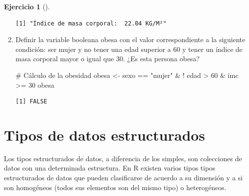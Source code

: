 \documentclass[
  a4paper,
]{scrreport}
\newenvironment{Shaded}{\begin{snugshade}}{\end{snugshade}}
\newcommand{\CommentTok}[1]{\textcolor[rgb]{0.37,0.37,0.37}{#1}}
\newcommand{\DecValTok}[1]{\textcolor[rgb]{0.68,0.00,0.00}{#1}}
\newcommand{\NormalTok}[1]{\textcolor[rgb]{0.00,0.23,0.31}{#1}}
\newcommand{\OtherTok}[1]{\textcolor[rgb]{0.00,0.23,0.31}{#1}}
\newcommand{\SpecialCharTok}[1]{\textcolor[rgb]{0.37,0.37,0.37}{#1}}
\newcommand{\StringTok}[1]{\textcolor[rgb]{0.13,0.47,0.30}{#1}}
\theoremstyle{definition}
\newtheorem{exercise}{Ejercicio}[chapter]
\theoremstyle{definition}
\theoremstyle{remark}
\begin{document}
\begin{exercise}[]
\begin{enumerate}
\begin{tcolorbox}
\begin{verbatim}
[1] "Índice de masa corporal:  22.04 KG/M²"
\end{verbatim}

  \end{tcolorbox}
\item
  Definir la variable booleana obesa con el valor correspondiente a la
  siguiente condición: ser mujer y no tener una edad superior a 60 y
  tener un índice de masa corporal mayor o igual que 30. ¿Es esta
  persona obesa?

  \begin{tcolorbox}[enhanced jigsaw, colbacktitle=quarto-callout-note-color!10!white, breakable, opacitybacktitle=0.6, left=2mm, opacityback=0, leftrule=.75mm, colframe=quarto-callout-note-color-frame, bottomrule=.15mm, toprule=.15mm, toptitle=1mm, colback=white, titlerule=0mm, title=\textcolor{quarto-callout-note-color}{\faInfo}\hspace{0.5em}{Solución}, rightrule=.15mm, arc=.35mm, bottomtitle=1mm, coltitle=black]

\begin{Shaded}
\begin{Highlighting}[]
\CommentTok{\# Cálculo de la obesidad}
\NormalTok{obesa }\OtherTok{\textless{}{-}}\NormalTok{ sexo }\SpecialCharTok{==} \StringTok{"mujer"} \SpecialCharTok{\&} \SpecialCharTok{!}\NormalTok{ edad }\SpecialCharTok{\textgreater{}} \DecValTok{60} \SpecialCharTok{\&}\NormalTok{ imc }\SpecialCharTok{\textgreater{}=} \DecValTok{30}
\NormalTok{obesa}
\end{Highlighting}
\end{Shaded}

\begin{verbatim}
[1] FALSE
\end{verbatim}

  \end{tcolorbox}
\end{enumerate}

\end{exercise}


\hypertarget{tipos-de-datos-estructurados}{%
\chapter{Tipos de datos
estructurados}\label{tipos-de-datos-estructurados}}

Los tipos estructurados de datos, a diferencia de los simples, son
colecciones de datos con una determinada estructura. En R existen varios
tipos tipos estructurados de datos que pueden clasificarse de acuerdo a
su dimensión y a si son homogéneos (todos sus elementos son del mismo
tipo) o heterogéneos.
\end{document}

